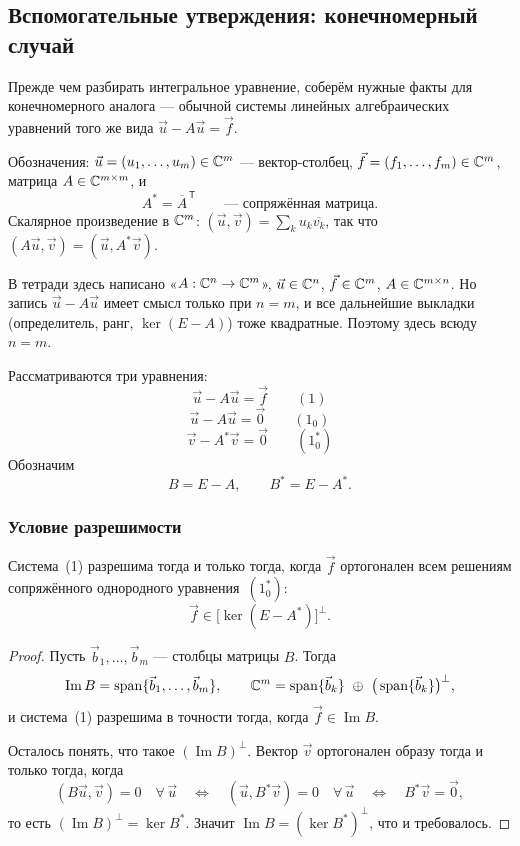 \subsection{Вспомогательные утверждения: конечномерный случай}

Прежде чем разбирать интегральное уравнение, соберём нужные факты для
конечномерного аналога — обычной системы линейных алгебраических уравнений
того же вида $\vec u - A\vec u = \vec f$.

\medskip
Обозначения: $\vec u = (u_1,\dots,u_m) \in \mathbb{C}^m$ — вектор-столбец,
$\vec f = (f_1,\dots,f_m) \in \mathbb{C}^m$, матрица $A \in \mathbb{C}^{m\times m}$, и
\[
  A^* = \overline{A}^{\,\mathsf{T}}
  \qquad\text{— сопряжённая матрица} .
\]
Скалярное произведение в $\mathbb{C}^m$:
$(\vec u, \vec v) = \sum_k u_k \overline{v_k}$, так что
$(A\vec u, \vec v) = (\vec u, A^*\vec v)$.

\begin{warn}
В тетради здесь написано «$A : \mathbb{C}^n \to \mathbb{C}^m$», $\vec u \in \mathbb{C}^n$,
$\vec f \in \mathbb{C}^m$, $A \in \mathbb{C}^{m\times n}$. Но запись $\vec u - A\vec u$ имеет
смысл только при $n = m$, и все дальнейшие выкладки (определитель, ранг,
$\ker(E-A)$) тоже квадратные. Поэтому здесь всюду $n = m$.
\end{warn}

Рассматриваются три уравнения:
\[
  \vec u - A\vec u = \vec f \qquad (1)
\]
\[
  \vec u - A\vec u = \vec 0 \qquad (1_0)
\]
\[
  \vec v - A^*\vec v = \vec 0 \qquad (1_0^*)
\]
Обозначим
\[
  B = E - A , \qquad B^* = E - A^* .
\]

\subsubsection*{Условие разрешимости}

\begin{proposition}\label{prop:fin-solvable}
Система~(1) разрешима тогда и только тогда, когда $\vec f$ ортогонален всем
решениям сопряжённого однородного уравнения~$(1_0^*)$:
\[
  \vec f \in \big[\ker (E - A^*)\big]^{\perp} .
\]
\end{proposition}

\begin{proof}
Пусть $\vec b_1, \dots, \vec b_m$ — столбцы матрицы $B$. Тогда
\[
  \operatorname{Im} B = \operatorname{span}\{\vec b_1, \dots, \vec b_m\} ,
  \qquad
  \mathbb{C}^m = \operatorname{span}\{\vec b_k\}
       \ \oplus\ \big(\operatorname{span}\{\vec b_k\}\big)^{\perp} ,
\]
и система~(1) разрешима в точности тогда, когда
$\vec f \in \operatorname{Im} B$.

\medskip
Осталось понять, что такое $(\operatorname{Im} B)^{\perp}$. Вектор $\vec v$
ортогонален образу тогда и только тогда, когда
\[
  (B\vec u, \vec v) = 0 \quad \forall\, \vec u
  \quad\Longleftrightarrow\quad
  (\vec u, B^*\vec v) = 0 \quad \forall\, \vec u
  \quad\Longleftrightarrow\quad
  B^*\vec v = \vec 0 ,
\]
то есть $(\operatorname{Im} B)^{\perp} = \ker B^*$. Значит
$\operatorname{Im} B = (\ker B^*)^{\perp}$, что и требовалось.
\end{proof}


